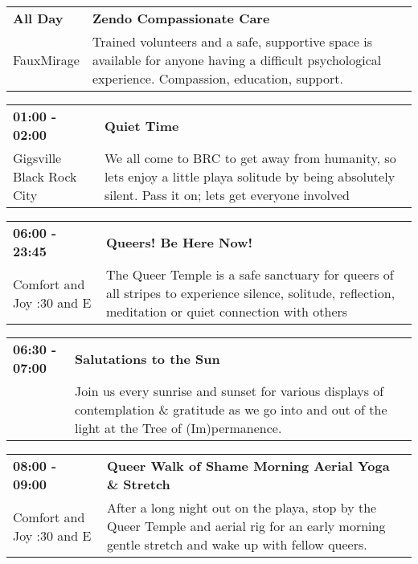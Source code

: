 \begin{tabular}{ p{1in} p{2.2in} }
    \textbf{All Day} & \textbf{Zendo Compassionate Care } \\
    FauxMirage \newline  & Trained volunteers and a safe, supportive space is available for anyone having a difficult psychological experience. Compassion, education, support. \\
    \hline 
\end{tabular}
    
\begin{tabular}{ p{1in} p{2.2in} }
    \textbf{01:00 - 02:00} & \textbf{Quiet Time} \\
    Gigsville \newline Black Rock City & We all come to BRC to get away from humanity, so lets enjoy a little playa solitude by being absolutely silent. Pass it on; lets get everyone involved \\
    \hline 
\end{tabular}
    
\begin{tabular}{ p{1in} p{2.2in} }
    \textbf{06:00 - 23:45} & \textbf{Queers! Be Here Now!} \\
    Comfort and Joy \newline 7:30 and E & The Queer Temple is a safe sanctuary for queers of all stripes to experience silence, solitude, reflection, meditation or quiet connection with others \\
    \hline 
\end{tabular}
    
\begin{tabular}{ p{1in} p{2.2in} }
    \textbf{06:30 - 07:00} & \textbf{Salutations to the Sun} \\
    ~ \newline  & Join us every sunrise and sunset for various displays of contemplation \& gratitude as we go into and out of the light at the Tree of (Im)permanence. \\
    \hline 
\end{tabular}
    
\begin{tabular}{ p{1in} p{2.2in} }
    \textbf{08:00 - 09:00} & \textbf{Queer Walk of Shame Morning Aerial Yoga \& Stretch} \\
    Comfort and Joy \newline 7:30 and E & After a long night out on the playa, stop by the Queer Temple and aerial rig for an early morning gentle stretch and wake up with fellow queers. \\
    \hline 
\end{tabular}
    
